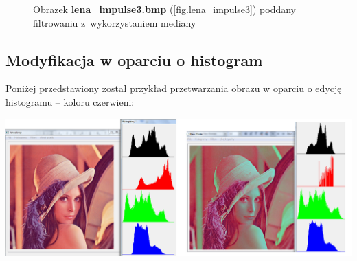 \documentclass{classrep}
\begin{document}
\begin{figure}
{{  \label{fig.lena_impulse3_median_5x5}
 }
}
\caption{Obrazek \textbf{lena\_impulse3.bmp} (\ref{fig.lena_impulse3}) poddany filtrowaniu z~wykorzystaniem mediany}
\label{fig.lena_impulse3_median}
\end{figure}

\subsection{Modyfikacja w oparciu o histogram}
Poniżej przedstawiony został przykład przetwarzania obrazu w oparciu o edycję histogramu – koloru czerwieni:

  \includegraphics[scale=0.25]{img/lenna_hist.jpg}
\end{document}
